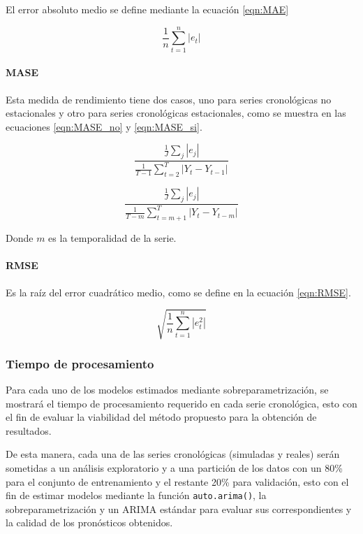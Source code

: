 \documentclass[
]{article}
\begin{document}
El error absoluto medio se define mediante la ecuación \ref{eqn:MAE}

\begin{equation}
\label{eqn:MAE}
\frac{1}{n}\sum_{t=1}^n |e_t|
\end{equation}

\paragraph{MASE}

Esta medida de rendimiento tiene dos casos, uno para series cronológicas
no estacionales y otro para series cronológicas estacionales, como se
muestra en las ecuaciones \ref{eqn:MASE_no} y \ref{eqn:MASE_si}.

\begin{equation}
\label{eqn:MASE_no}
\frac{\frac{1}{J}\sum_j|e_j|}{\frac{1}{T-1}\sum_{t=2}^T|Y_t-Y_{t-1}|}
\end{equation}

\begin{equation}
\label{eqn:MASE_si}
\frac{\frac{1}{J}\sum_j|e_j|}{\frac{1}{T-m}\sum_{t=m+1}^T|Y_t-Y_{t-m}|}
\end{equation}

Donde \(m\) es la temporalidad de la serie.

\paragraph{RMSE}

Es la raíz del error cuadrático medio, como se define en la ecuación
\ref{eqn:RMSE}.

\begin{equation}
\label{eqn:RMSE}
\sqrt{\frac{1}{n}\sum_{t=1}^n |e_t^2|}
\end{equation}

\subsubsection{Tiempo de procesamiento}

Para cada uno de los modelos estimados mediante sobreparametrización, se
mostrará el tiempo de procesamiento requerido en cada serie cronológica,
esto con el fin de evaluar la viabilidad del método propuesto para la
obtención de resultados.

De esta manera, cada una de las series cronológicas (simuladas y reales)
serán sometidas a un análisis exploratorio y a una partición de los
datos con un 80\% para el conjunto de entrenamiento y el restante 20\%
para validación, esto con el fin de estimar modelos mediante la función
\texttt{auto.arima()}, la sobreparametrización y un ARIMA estándar para
evaluar sus correspondientes y la calidad de los pronósticos obtenidos.
\end{document}
